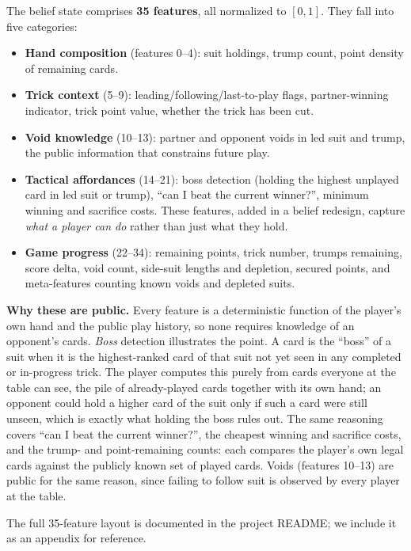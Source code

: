 \documentclass[runningheads]{llncs}
\begin{document}
The belief state comprises \textbf{35 features}, all normalized to $[0,1]$. They
fall into five categories:\smallskip
\begin{itemize}
\item \textbf{Hand composition} (features 0--4): suit holdings, trump count,
  point density of remaining cards.
\item \textbf{Trick context} (5--9): leading/following/last-to-play flags,
  partner-winning indicator, trick point value, whether the trick has been cut.
\item \textbf{Void knowledge} (10--13): partner and opponent voids in led suit
  and trump, the public information that constrains future play.
\item \textbf{Tactical affordances} (14--21): boss detection (holding the
  highest unplayed card in led suit or trump), ``can I beat the current
  winner?'', minimum winning and sacrifice costs. These features, added in a
  belief redesign, capture \emph{what a player can do} rather than just what
  they hold.
\item \textbf{Game progress} (22--34): remaining points, trick number, trumps
  remaining, score delta, void count, side-suit lengths and depletion, secured
  points, and meta-features counting known voids and depleted suits.
\end{itemize}

\textbf{Why these are public.} Every feature is a deterministic function of the
player's own hand and the public play history, so none requires knowledge of an
opponent's cards. \emph{Boss} detection illustrates the point. A card is the
``boss'' of a suit when it is the highest-ranked card of that suit not yet seen
in any completed or in-progress trick. The player computes this purely from
cards everyone at the table can see, the pile of already-played cards together
with its own hand; an opponent could hold a higher card of the suit only if such
a card were still unseen, which is exactly what holding the boss rules out. The
same reasoning covers ``can I beat the current winner?'', the cheapest winning
and sacrifice costs, and the trump- and point-remaining counts: each compares
the player's own legal cards against the publicly known set of played cards.
Voids (features 10--13) are public for the same reason, since failing to follow
suit is observed by every player at the table.

The full 35-feature layout is documented in the project README; we include it
as an appendix for reference.
\end{document}
